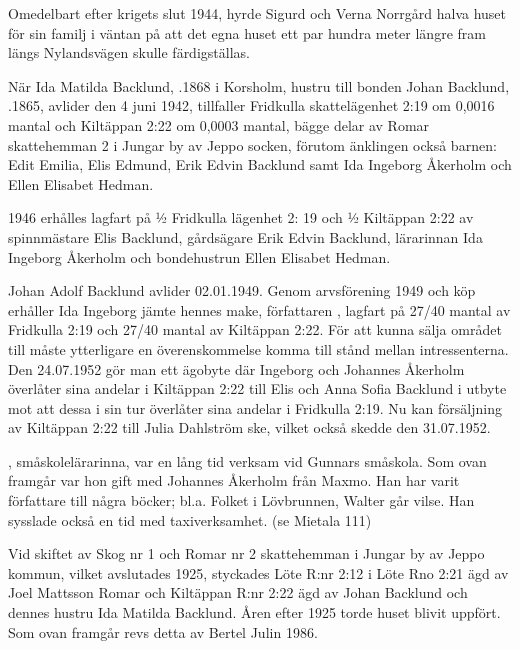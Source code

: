 Omedelbart efter krigets slut 1944, hyrde Sigurd och Verna Norrgård halva huset för sin familj i väntan på att det egna huset ett par hundra meter längre fram längs Nylandsvägen skulle färdigställas.


%


%
När Ida Matilda Backlund, .1868 i Korsholm, hustru till bonden Johan Backlund, .1865, avlider den 4 juni 1942, tillfaller Fridkulla skattelägenhet 2:19 om 0,0016 mantal och Kiltäppan 2:22 om 0,0003 mantal, bägge delar av Romar skattehemman 2 i Jungar by av Jeppo socken, förutom änklingen också barnen: Edit Emilia, Elis Edmund, Erik Edvin Backlund samt Ida Ingeborg Åkerholm och Ellen Elisabet Hedman.

1946 erhålles lagfart på ½ Fridkulla lägenhet 2: 19 och ½ Kiltäppan 2:22 av spinnmästare Elis Backlund, gårdsägare Erik Edvin Backlund, lärarinnan Ida Ingeborg Åkerholm och bondehustrun Ellen Elisabet Hedman.

Johan Adolf Backlund avlider 02.01.1949. Genom arvsförening 1949 och köp erhåller Ida Ingeborg jämte hennes make, författaren , lagfart på 27/40 mantal av Fridkulla 2:19 och 27/40 mantal av Kiltäppan 2:22. För att kunna sälja området till  måste ytterligare en överenskommelse komma till stånd mellan intressenterna. Den 24.07.1952 gör man ett ägobyte där Ingeborg och Johannes Åkerholm överlåter sina andelar i Kiltäppan 2:22 till Elis och Anna Sofia Backlund i utbyte mot att dessa i sin tur överlåter sina andelar i Fridkulla 2:19. Nu kan försäljning av Kiltäppan 2:22 till Julia Dahlström ske, vilket också skedde den 31.07.1952.

, småskolelärarinna, var en lång tid verksam vid Gunnars småskola. Som ovan framgår var hon gift med Johannes Åkerholm från Maxmo. Han har varit författare till några böcker; bl.a. Folket i Lövbrunnen, Walter går vilse. Han sysslade också en tid med taxiverksamhet. (se Mietala 111)


%


%
Vid skiftet av Skog nr 1 och Romar nr 2 skattehemman i Jungar by av Jeppo kommun, vilket avslutades 1925, styckades Löte R:nr 2:12 i Löte Rno 2:21 ägd av Joel Mattsson Romar och Kiltäppan  R:nr 2:22 ägd av Johan Backlund och dennes hustru Ida Matilda Backlund. Åren efter 1925 torde huset blivit uppfört. Som ovan framgår revs detta av Bertel Julin 1986.

